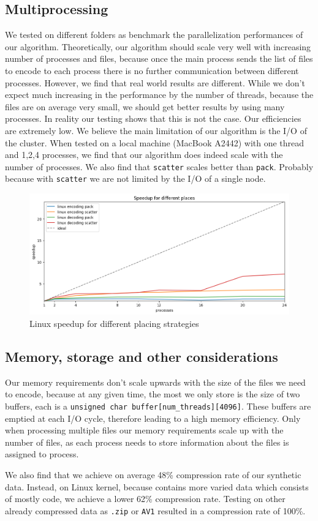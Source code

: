 \subsection{Multiprocessing}
We tested on different folders as benchmark the parallelization performances of our algorithm. Theoretically, our algorithm should scale very well with increasing number of processes and files, because once the main process sends the list of files to encode to each process there is no further communication between different processes. However, we find that real world results are different. 
While we don't expect much increasing in the performance by the number of threads, because the files are on average very small, we should get better results by using many processes.
In reality our testing shows that this is not the case. Our efficiencies are extremely low. We believe the main limitation of our algorithm is the I/O of the cluster. When tested on a local machine (MacBook A2442) with one thread and 1,2,4 processes, we find that our algorithm does indeed scale with the number of processes.
We also find that \verb|scatter| scales better than \verb|pack|. Probably because with \verb|scatter| we are not limited by the I/O of a single node.
\begin{figure}
	\centering
	\includegraphics[width=1\linewidth]{"../imgs/linux speedup"}
	\caption{Linux speedup for different placing strategies}
	\label{fig:linux-scatter-pack}
\end{figure}
\subsection{Memory, storage and other considerations}
Our memory requirements don't scale upwards with the size of the files we need to encode, because at any given time, the most we only store is the size of two buffers, each is a \verb|unsigned char buffer[num_threads][4096]|. These buffers are emptied at each I/O cycle, therefore leading to a high memory efficiency. Only when processing multiple files our memory requirements scale up with the number of files, as each process needs to store information about the files is assigned to process.

We also find that we achieve on average 48\% compression rate of our synthetic data. Instead, on Linux kernel, because contains more varied data which consists of mostly code, we achieve a lower 62\% compression rate. Testing on other already compressed data as \verb|.zip| or \verb|AV1| resulted in a compression rate of 100\%.
